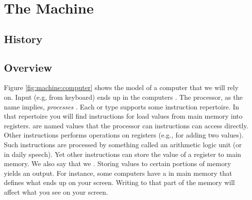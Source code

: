 \section{The Machine}
\label{sec:machine}

\subsection{History}







\subsection{Overview}

Figure \ref{fig:machine:computer} shows the model of a computer that we will rely on. Input (e.g, from keyboard) ends up in the computers . The processor, as the name implies, \textsl{processes} . Each  or type supports some instruction repertoire. In that repertoire you will find instructions for load values from main memory into registers.  are named values that the processor can instructions can access directly. Other instructions performs operations on registers (e.g., for adding two values). Such instructions are processed by something called an arithmetic logic unit (or  in daily speech). Yet other instructions can store the value of a register to main memory. We also say that we . Storing values to certain portions of memory yields an output. For instance, some computers have a  in main memory that defines what ends up on your screen. Writing to that part of the memory will affect what you see on your screen.

